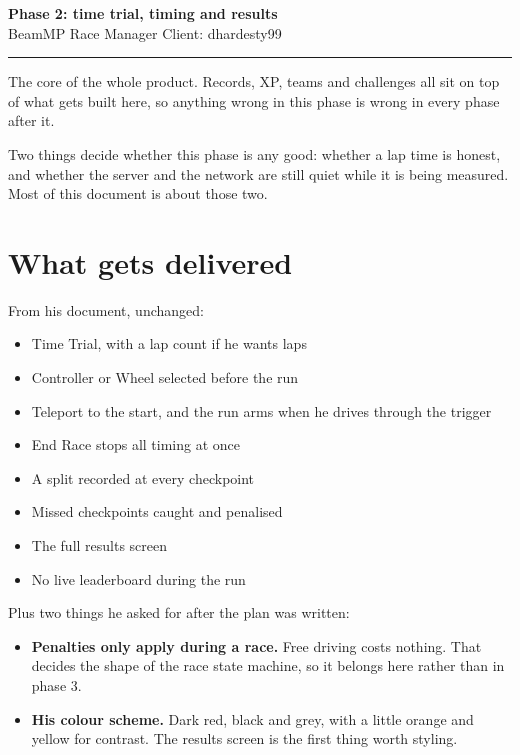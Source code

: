 \documentclass[11pt,a4paper]{article}
\begin{document}
\begin{center}
{\LARGE\bfseries Phase 2: time trial, timing and results}\\[4pt]
{\small BeamMP Race Manager \quad Client: dhardesty99}
\end{center}

\vspace{4pt}
\hrule
\vspace{8pt}

The core of the whole product. Records, XP, teams and challenges all sit on top
of what gets built here, so anything wrong in this phase is wrong in every
phase after it.

Two things decide whether this phase is any good: whether a lap time is honest,
and whether the server and the network are still quiet while it is being
measured. Most of this document is about those two.

\section{What gets delivered}

From his document, unchanged:

\begin{itemize}
  \item Time Trial, with a lap count if he wants laps
  \item Controller or Wheel selected before the run
  \item Teleport to the start, and the run arms when he drives through the trigger
  \item End Race stops all timing at once
  \item A split recorded at every checkpoint
  \item Missed checkpoints caught and penalised
  \item The full results screen
  \item No live leaderboard during the run
\end{itemize}

Plus two things he asked for after the plan was written:

\begin{itemize}
  \item \textbf{Penalties only apply during a race.} Free driving costs
        nothing. That decides the shape of the race state machine, so it
        belongs here rather than in phase 3.
  \item \textbf{His colour scheme.} Dark red, black and grey, with a little
        orange and yellow for contrast. The results screen is the first thing
        worth styling.
\end{itemize}
\end{document}
